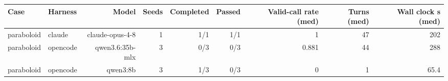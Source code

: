 \begin{tabular}{llrrrrrrr}
\toprule
Case & Harness & Model & Seeds & Completed & Passed & Valid-call rate (med) & Turns (med) & Wall clock s (med) \\
\midrule
paraboloid & claude & claude-opus-4-8 & 1 & 1/1 & 1/1 & 1 & 47 & 202 \\
\addlinespace
paraboloid & opencode & qwen3.6:35b-mlx & 3 & 0/3 & 0/3 & 0.881 & 44 & 288 \\
\addlinespace
paraboloid & opencode & qwen3:8b & 3 & 1/3 & 0/3 & 0 & 1 & 65.4 \\
\bottomrule
\end{tabular}
